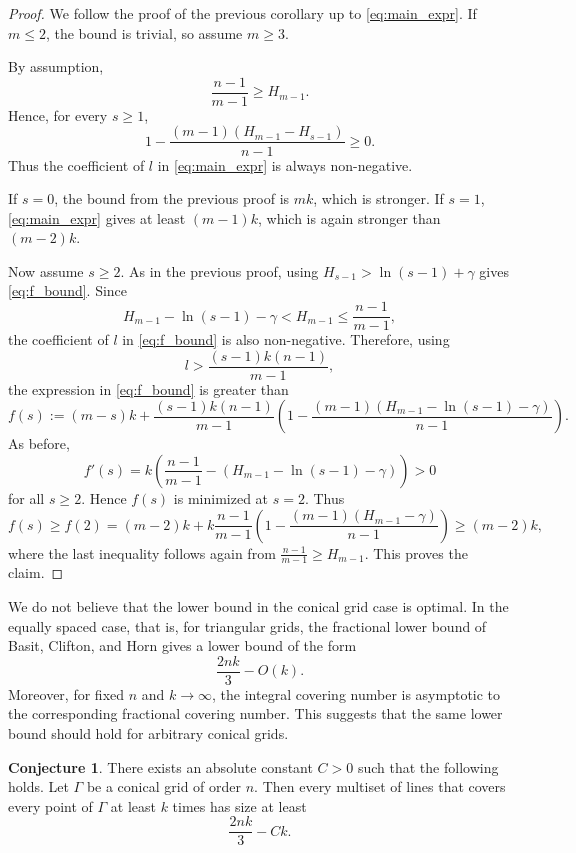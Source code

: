\documentclass[usenames,dvipsnames, 11pt]{article}
\numberwithin{thm}{section}
\theoremstyle{definition}
\theoremstyle{definition}
\theoremstyle{definition}
\newtheorem{conj}{Conjecture}
\newcommand{\1}{\mathbf{1}}
\begin{document}
\begin{proof}
    We follow the proof of the previous corollary up to
    \eqref{eq:main_expr}. If $m\leq 2$, the bound is trivial, so assume
    $m\geq 3$.

    By assumption,
    \[
    \frac{n-1}{m-1}\geq H_{m-1}.
    \]
    Hence, for every $s\geq 1$,
    \[
    1-\frac{(m-1)(H_{m-1}-H_{s-1})}{n-1}\geq 0.
    \]
    Thus the coefficient of $l$ in \eqref{eq:main_expr} is always
    non-negative.

    If $s=0$, the bound from the previous proof is $mk$, which is stronger.
    If $s=1$, \eqref{eq:main_expr} gives at least $(m-1)k$, which is again
    stronger than $(m-2)k$.

    Now assume $s\geq 2$. As in the previous proof, using
    $H_{s-1}>\ln(s-1)+\gamma$ gives \eqref{eq:f_bound}. Since
    \[
    H_{m-1}-\ln(s-1)-\gamma < H_{m-1}\leq \frac{n-1}{m-1},
    \]
    the coefficient of $l$ in \eqref{eq:f_bound} is also non-negative.
    Therefore, using
    \[
    l>\frac{(s-1)k(n-1)}{m-1},
    \]
    the expression in \eqref{eq:f_bound} is greater than
    \[
    f(s):=(m-s)k+
    \frac{(s-1)k(n-1)}{m-1}
    \left(
    1-\frac{(m-1)(H_{m-1}-\ln(s-1)-\gamma)}{n-1}
    \right).
    \]
    As before,
    \[
    f'(s)=
    k\left(
    \frac{n-1}{m-1}
    -
    (H_{m-1}-\ln(s-1)-\gamma)
    \right)>0
    \]
    for all $s\geq 2$. Hence $f(s)$ is minimized at $s=2$. Thus
    \[
    f(s)\geq f(2)
    =
    (m-2)k+
    k\frac{n-1}{m-1}
    \left(
    1-\frac{(m-1)(H_{m-1}-\gamma)}{n-1}
    \right)
    \geq
    (m-2)k,
    \]
    where the last inequality follows again from
    $\frac{n-1}{m-1}\geq H_{m-1}$. This proves the claim.
\end{proof}
We do not believe that the lower bound in the conical grid case is optimal.  In the equally
spaced case, that is, for triangular grids, the fractional lower bound of
Basit, Clifton, and Horn gives a lower bound of the form
\[
\frac{2nk}{3}-O(k).
\]
Moreover, for fixed $n$ and $k\to\infty$, the integral covering number is
asymptotic to the corresponding fractional covering number. This suggests
that the same lower bound should hold for arbitrary conical grids.

\begin{conj}
    There exists an absolute constant $C>0$ such that the following holds.
    Let $\Gamma$ be a conical grid of order $n$. Then every multiset of lines
    that covers every point of $\Gamma$ at least $k$ times has size at least
    \[
    \frac{2nk}{3}-Ck.
    \]
\end{conj}
\end{document}
